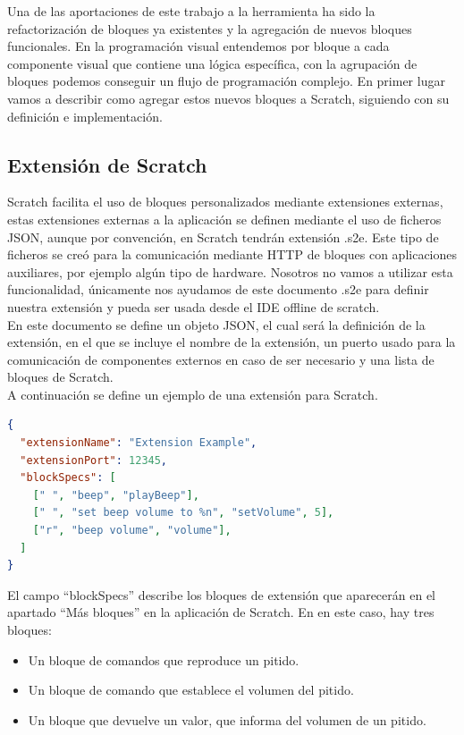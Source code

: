 Una de las aportaciones de este trabajo a la herramienta ha sido la refactorización de bloques ya existentes y la agregación de nuevos bloques funcionales.
En la programación visual entendemos por bloque a cada componente visual que contiene una lógica específica, con la agrupación de bloques podemos conseguir un flujo de programación complejo. En primer lugar vamos a describir como agregar estos nuevos bloques a Scratch, siguiendo con su definición e implementación.

\subsection{Extensión de Scratch}

Scratch facilita el uso de bloques personalizados mediante extensiones externas, estas  extensiones externas a la aplicación se definen mediante el uso de ficheros JSON, aunque por convención, en Scratch tendrán extensión .s2e. Este tipo de ficheros se creó para la comunicación mediante HTTP de bloques con aplicaciones auxiliares, por ejemplo algún tipo de hardware. Nosotros no vamos a utilizar esta funcionalidad, únicamente nos ayudamos de este documento .s2e para definir nuestra extensión y pueda ser usada desde el IDE offline de scratch.\\

En este documento se define un objeto JSON, el cual será la definición de la extensión, en el que se incluye el nombre de la extensión, un puerto usado para la comunicación de componentes externos en caso de ser necesario y una lista de bloques de Scratch. \\

A continuación se define un ejemplo de una extensión para Scratch. 
\begin{lstlisting}[language=json,firstnumber=1]
{ 
  "extensionName": "Extension Example",
  "extensionPort": 12345,
  "blockSpecs": [
    [" ", "beep", "playBeep"],
	[" ", "set beep volume to %n", "setVolume", 5],
	["r", "beep volume", "volume"],
  ]
}
\end{lstlisting}

El campo ``blockSpecs'' describe los bloques de extensión que aparecerán en el apartado ``Más bloques'' en la aplicación de Scratch.
En en este caso, hay tres bloques:
\begin{itemize}
\item Un bloque de comandos que reproduce un pitido.
\item Un bloque de comando que
establece el volumen del pitido.
\item Un bloque que devuelve un valor, que informa del volumen de un pitido.
\end{itemize}

